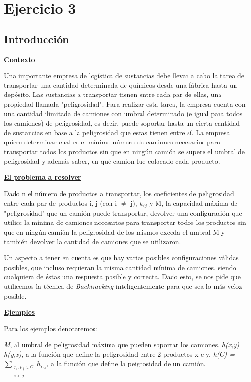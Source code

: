 \section{Ejercicio 3}

\subsection{Introducción}

\noindent \underline{\textbf{Contexto}}

Una importante empresa de logística de sustancias debe llevar a cabo la tarea de transportar una cantidad determinada de químicos desde una fábrica hasta un depósito. Las sustancias a transportar tienen entre cada par de ellas, una propiedad llamada "peligrosidad".
Para realizar esta tarea, la empresa cuenta con una cantidad ilimitada de camiones con umbral determinado (e igual para todos los camiones) de peligrosidad, es decir, puede soportar hasta un cierta cantidad de sustancias en base a la peligrosidad que estas tienen entre sí.
La empresa quiere determinar cual es el mínimo número de camiones necesarios para transportar todos los productos sin que en ningún camión se supere el umbral de peligrosidad y además saber, en qué camion fue colocado cada producto.

\noindent \underline{\textbf{El problema a resolver}}

Dado n el número de productos a transportar, los coeficientes de peligrosidad entre cada par de productos i, j (con i $\neq$ j), $h_{ij}$ y M, la capacidad máxima de "peligrosidad" que un camión puede transportar, devolver una configuración que utilice la mínima de camiones necesarios para transportar todos los productos sin que en ningún camión la peligrosidad de los mismos exceda el umbral M y también devolver la cantidad de camiones que se utilizaron.

Un aspecto a tener en cuenta es que hay varias posibles configuraciones válidas posibles, que incluso requieran la misma cantidad mínima de camiones, siendo cualquiera de éstas una respuesta posible y correcta. Dado esto, se nos pide que utilicemos la técnica de \textit{Backtracking} inteligentemente para que sea lo más veloz posible.

\noindent \underline{\textbf{Ejemplos}}

\noindent Para los ejemplos denotaremos:

\textit{M}, al umbral de peligrosidad máxima que pueden soportar los camiones.\newline
\indent \textit{h(x,y) = h(y,x)}, a la función que define la peligrosidad entre 2 productos x e y.\newline
\indent \textit{h(C) = $\sum_{\substack{p_i,p_j \in C \\ i < j}} h_{i,j}$}, a la función que define la peigrosidad de un camión.

